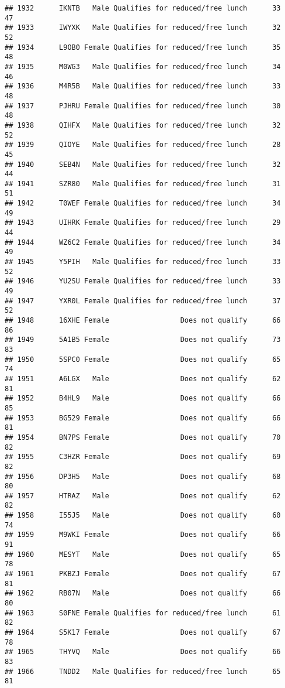 \documentclass[
]{article}
\begin{document}
\begin{verbatim}
## 1932      IKNTB   Male Qualifies for reduced/free lunch      33       47
## 1933      IWYXK   Male Qualifies for reduced/free lunch      32       52
## 1934      L9OB0 Female Qualifies for reduced/free lunch      35       48
## 1935      M0WG3   Male Qualifies for reduced/free lunch      34       46
## 1936      M4R5B   Male Qualifies for reduced/free lunch      33       48
## 1937      PJHRU Female Qualifies for reduced/free lunch      30       48
## 1938      QIHFX   Male Qualifies for reduced/free lunch      32       52
## 1939      QIOYE   Male Qualifies for reduced/free lunch      28       45
## 1940      SEB4N   Male Qualifies for reduced/free lunch      32       44
## 1941      SZR80   Male Qualifies for reduced/free lunch      31       51
## 1942      T0WEF Female Qualifies for reduced/free lunch      34       49
## 1943      UIHRK Female Qualifies for reduced/free lunch      29       44
## 1944      WZ6C2 Female Qualifies for reduced/free lunch      34       49
## 1945      Y5PIH   Male Qualifies for reduced/free lunch      33       52
## 1946      YU2SU Female Qualifies for reduced/free lunch      33       49
## 1947      YXR0L Female Qualifies for reduced/free lunch      37       52
## 1948      16XHE Female                 Does not qualify      66       86
## 1949      5A1B5 Female                 Does not qualify      73       83
## 1950      5SPC0 Female                 Does not qualify      65       74
## 1951      A6LGX   Male                 Does not qualify      62       81
## 1952      B4HL9   Male                 Does not qualify      66       85
## 1953      BG529 Female                 Does not qualify      66       81
## 1954      BN7PS Female                 Does not qualify      70       82
## 1955      C3HZR Female                 Does not qualify      69       82
## 1956      DP3H5   Male                 Does not qualify      68       80
## 1957      HTRAZ   Male                 Does not qualify      62       82
## 1958      I55J5   Male                 Does not qualify      60       74
## 1959      M9WKI Female                 Does not qualify      66       91
## 1960      MESYT   Male                 Does not qualify      65       78
## 1961      PKBZJ Female                 Does not qualify      67       81
## 1962      RB07N   Male                 Does not qualify      66       80
## 1963      S0FNE Female Qualifies for reduced/free lunch      61       82
## 1964      S5K17 Female                 Does not qualify      67       78
## 1965      THYVQ   Male                 Does not qualify      66       83
## 1966      TNDD2   Male Qualifies for reduced/free lunch      65       81

\end{verbatim}
\end{document}
